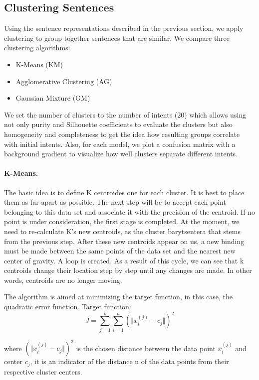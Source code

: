 \documentclass[11pt]{article}
\begin{document}
\subsection{Clustering Sentences}

Using the sentence representations described in the previous section, we apply clustering to group together sentences that are similar. We compare three clustering algorithms:

\begin{itemize}
\item K-Means (KM)
\item Agglomerative Clustering (AG)
\item Gaussian Mixture (GM)
\end{itemize}

We set the number of clusters to the number of intents (20)
which allows using not only purity and Silhouette coefficients to
evaluate the clusters but also homogeneity and completeness to get the
idea how resulting groups correlate with initial intents. Also, for
each model, we plot a confusion matrix with a background gradient
to visualize how well clusters separate different intents.


\paragraph{K-Means.} The basic idea is to define K centroides one for each cluster. It is best to place them as far apart as possible. The next step will be to accept each point belonging to this data set and associate it with the precision of the centroid. If no point is under consideration, the first stage is completed. At the moment, we need to re-calculate K's new centroids, as the cluster barytsentera that stems from the previous step. After these new centroids appear on us, a new binding must be made between the same points of the data set and the nearest new center of gravity. A loop is created. As a result of this cycle, we can see that k centroids change their location step by step until any changes are made. In other words, centroids are no longer moving.

The algorithm is aimed at minimizing the target function, in this case, the quadratic error function. Target function:
\begin{equation}
J = \sum_{j=1}^{k} \sum_{i=1}^{n} (\Vert x_{i}^{(j)} - c_{j} \Vert)^{2}
\end{equation}

where $(\Vert x_{i}^{(j)} - c_{j} \Vert)^{2}$ is the chosen distance between the data point $x_{i}^{(j)}$ and center $c_{j}$, it is an indicator of the distance n of the data points from their respective cluster centers.
\end{document}
